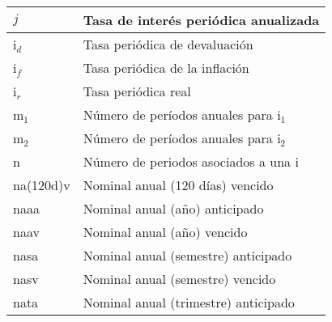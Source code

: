 \begin{spacing}{1}
\begin{center}
\begin{tabular}{ |p{2.5cm}|p{9.5cm}|}
			$j$                       & Tasa de interés periódica anualizada                                                \\  \hline
			
			i$_{d}$                   & Tasa periódica de devaluación                                                       \\ \hline
			i$_{f}$                   & Tasa periódica de la inflación                                                      \\ \hline
			i$_{r}$                   & Tasa periódica real                                                                 \\ \hline
			
			m$_{1}$                   & Número de períodos anuales para  i$_{1}$                                            \\ \hline
			
			m$_{2}$                   & Número de períodos anuales para  i$_{2}$                                            \\ \hline
			
			n                         & Número de periodos asociados a una i                                                \\ \hline
			
			na(120d)v                 & Nominal anual (120 días) vencido                                                    \\ \hline
			
			naaa                      & Nominal anual (año) anticipado                                                      \\ \hline
			
			naav                      & Nominal anual (año) vencido                                                         \\ \hline
			
			nasa                      & Nominal anual (semestre) anticipado                                                 \\\hline
			
			nasv                      & Nominal anual (semestre) vencido                                                    \\\hline
			
			nata                      & Nominal anual (trimestre) anticipado                                                \\ \hline
			

\end{tabular}
\end{center}
\end{spacing}
